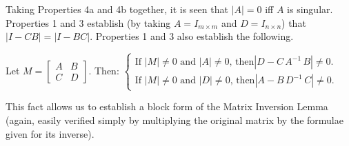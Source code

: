 \clearpage

Taking Properties 4a and 4b together, it is seen that $|A|=0$ iff $A$
is singular.  Properties 1 and 3 establish (by taking $A=I_{m\times
m}$ and $D=I_{n\times n}$) that $|I-CB|=|I-BC|$.  Properties 1 and 3
also establish the following.
 
\begin{fact} \label{fact.A.B.A.A}
Let $M=\begin{bmatrix} A & B \\ C & D
\end{bmatrix}$.  Then: $\begin{cases} \textrm{If $|M|\ne 0$ and $|A|\ne 0$, then
$|D-C\,A^{-1}\,B|\ne 0$.}\\ \textrm{If $|M|\ne 0$ and $|D|\ne 0$, then
$|A-B\,D^{-1}\,C|\ne 0$.} \end{cases}$
\end{fact}

\noindent This fact allows us to establish a block form of the Matrix Inversion
Lemma (again, easily verified simply by multiplying the original
matrix by the formulae given for its inverse).


